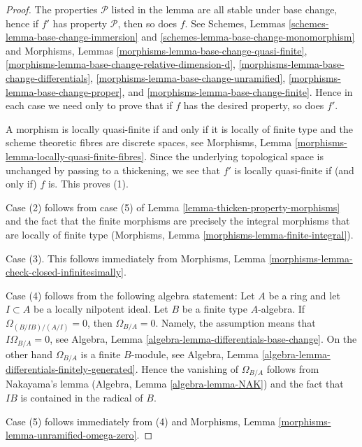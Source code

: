 \begin{proof}
The properties $\mathcal{P}$ listed in the lemma are all stable
under base change, hence if $f'$ has property $\mathcal{P}$, then so
does $f$. See
Schemes, Lemmas \ref{schemes-lemma-base-change-immersion} and
\ref{schemes-lemma-base-change-monomorphism}
and
Morphisms, Lemmas
\ref{morphisms-lemma-base-change-quasi-finite},
\ref{morphisms-lemma-base-change-relative-dimension-d},
\ref{morphisms-lemma-base-change-differentials},
\ref{morphisms-lemma-base-change-unramified},
\ref{morphisms-lemma-base-change-proper}, and
\ref{morphisms-lemma-base-change-finite}.
Hence in each case we need only to prove that if $f$ has
the desired property, so does $f'$.

\medskip\noindent
A morphism is locally quasi-finite if and only if it is locally
of finite type and the scheme theoretic fibres are discrete spaces, see
Morphisms, Lemma \ref{morphisms-lemma-locally-quasi-finite-fibres}.
Since the underlying topological space is unchanged by 
passing to a thickening, we see that $f'$ is locally quasi-finite if
(and only if) $f$ is. This proves (1).

\medskip\noindent
Case (2) follows from case (5) of Lemma \ref{lemma-thicken-property-morphisms}
and the fact that the finite morphisms are precisely
the integral morphisms that are locally of finite type
(Morphisms, Lemma \ref{morphisms-lemma-finite-integral}).

\medskip\noindent
Case (3). This follows immediately from
Morphisms, Lemma \ref{morphisms-lemma-check-closed-infinitesimally}.

\medskip\noindent
Case (4) follows from the following algebra statement: Let $A$ be a ring and
let $I \subset A$ be a locally nilpotent ideal. Let $B$ be a finite type
$A$-algebra. If $\Omega_{(B/IB)/(A/I)} = 0$, then $\Omega_{B/A} = 0$.
Namely, the assumption means that $I\Omega_{B/A} = 0$, see
Algebra, Lemma \ref{algebra-lemma-differentials-base-change}.
On the other hand $\Omega_{B/A}$ is a finite $B$-module, see
Algebra, Lemma \ref{algebra-lemma-differentials-finitely-generated}.
Hence the vanishing of $\Omega_{B/A}$ follows from Nakayama's
lemma (Algebra, Lemma \ref{algebra-lemma-NAK}) and the fact
that $IB$ is contained in the radical of $B$.

\medskip\noindent
Case (5) follows immediately from (4) and
Morphisms, Lemma \ref{morphisms-lemma-unramified-omega-zero}.


\end{proof}

